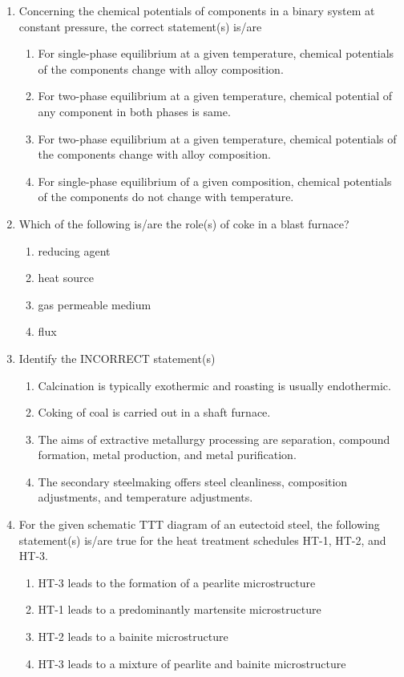 \documentclass[12pt]{article}
\begin{document}
\begin{enumerate}
\item Concerning the chemical potentials of components in a binary system at constant pressure, the correct statement(s) is/are
\begin{enumerate}[label=(\alph*)]
\item For single-phase equilibrium at a given temperature, chemical potentials of the components change with alloy composition.
\item For two-phase equilibrium at a given temperature, chemical potential of any component in both phases is same.
\item For two-phase equilibrium at a given temperature, chemical potentials of the components change with alloy composition.
\item For single-phase equilibrium of a given composition, chemical potentials of the components do not change with temperature.
\end{enumerate}

\item Which of the following is/are the role(s) of coke in a blast furnace?  
\begin{enumerate}[label=(\alph*)]
\item reducing agent
\item heat source
\item gas permeable medium
\item flux
\end{enumerate}

\item Identify the INCORRECT statement(s)  
\begin{enumerate}[label=(\alph*)]
\item Calcination is typically exothermic and roasting is usually endothermic.
\item Coking of coal is carried out in a shaft furnace.
\item The aims of extractive metallurgy processing are separation, compound formation, metal production, and metal purification.
\item The secondary steelmaking offers steel cleanliness, composition adjustments, and temperature adjustments.
\end{enumerate}

\item For the given schematic TTT diagram of an eutectoid steel, the following statement(s) is/are true for the heat treatment schedules HT-1, HT-2, and HT-3.  
\begin{enumerate}[label=(\alph*)]
\item HT-3 leads to the formation of a pearlite microstructure
\item HT-1 leads to a predominantly martensite microstructure
\item HT-2 leads to a bainite microstructure
\item HT-3 leads to a mixture of pearlite and bainite microstructure
\end{enumerate}


\end{enumerate}
\end{document}
